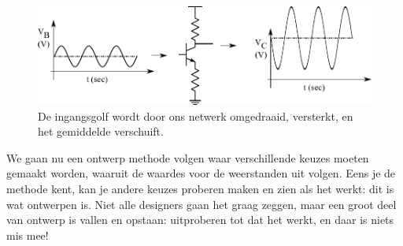 \documentclass{article}
\begin{document}
				\begin{figure}[htbp]
					\centering
					\includegraphics[width=\linewidth]{golven}
					\caption{De ingangsgolf wordt door ons netwerk omgedraaid, versterkt, en het gemiddelde verschuift.}
					\label{fig:golven}
				\end{figure}

				We gaan nu een ontwerp methode volgen waar verschillende keuzes moeten gemaakt worden, waaruit de waardes voor de weerstanden uit volgen. Eens je de methode kent, kan je andere keuzes proberen maken en zien als het werkt: dit is wat ontwerpen is. Niet alle designers gaan het graag zeggen, maar een groot deel van ontwerp is vallen en opstaan: uitproberen tot dat het werkt, en daar is niets mis mee!
\end{document}

